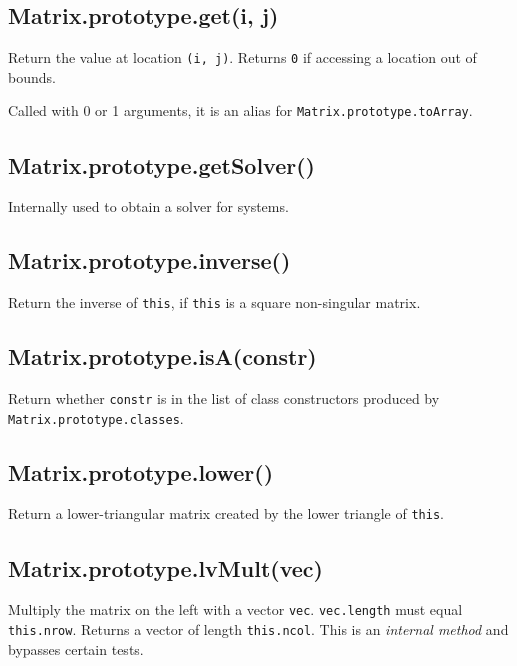 \documentclass{article}
\begin{document}
    \subsection*{Matrix.prototype.get(i, j)}
    Return the value at location \texttt{(i, j)}. Returns \texttt{0} if accessing a location out
of bounds.


Called with 0 or 1 arguments, it is an alias for \texttt{Matrix.prototype.toArray}.


    \subsection*{Matrix.prototype.getSolver()}
    Internally used to obtain a solver for systems.


    \subsection*{Matrix.prototype.inverse()}
    Return the inverse of \texttt{this}, if \texttt{this} is a square non-singular matrix.


    \subsection*{Matrix.prototype.isA(constr)}
    Return whether \texttt{constr} is in the list of class constructors produced by
\texttt{Matrix.prototype.classes}.


    \subsection*{Matrix.prototype.lower()}
    Return a lower-triangular matrix created by the lower triangle of \texttt{this}.


    \subsection*{Matrix.prototype.lvMult(vec)}
    Multiply the matrix on the left with a vector \texttt{vec}. \texttt{vec.length} must equal \texttt{this.nrow}.
Returns a vector of length \texttt{this.ncol}. This is an \emph{internal method} and bypasses certain tests.
\end{document}
